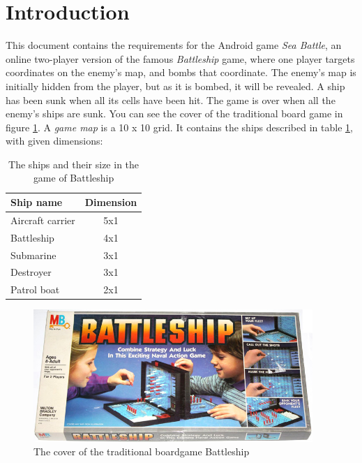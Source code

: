 \section{Introduction}
This document contains the requirements for the Android game \textit{Sea Battle}, an online two-player version of the famous \textit{Battleship} game, where one player targets coordinates on the enemy's map, and bombs that coordinate. The enemy's map is initially hidden from the player, but as it is bombed, it will be revealed. A ship has been sunk when all its cells have been hit. The game is over when all the enemy's ships are sunk. You can see the cover of the traditional board game in figure \ref{fig:battleship-boardgame}.
\newline
\newline
A \textit{game map} is a 10 x 10 grid. It contains the ships described in table \ref{tab:ships}, with given dimensions:

\begin{table} [h]
    \centering
    \begin{tabular}{l | c}
        Ship name & Dimension \\
        \hline
        Aircraft carrier & 5x1 \\
        Battleship & 4x1 \\
        Submarine & 3x1 \\
        Destroyer & 3x1 \\
        Patrol boat & 2x1 \\
    \end{tabular}
    \label{tab:ships}
    \caption{The ships and their size in the game of Battleship}
\end{table}

\begin{figure}[h]
  \centering
    \includegraphics[width=300pt]{figs/battleship.jpg}
  \caption{The cover of the traditional boardgame Battleship}
  \label{fig:battleship-boardgame}
\end{figure}

